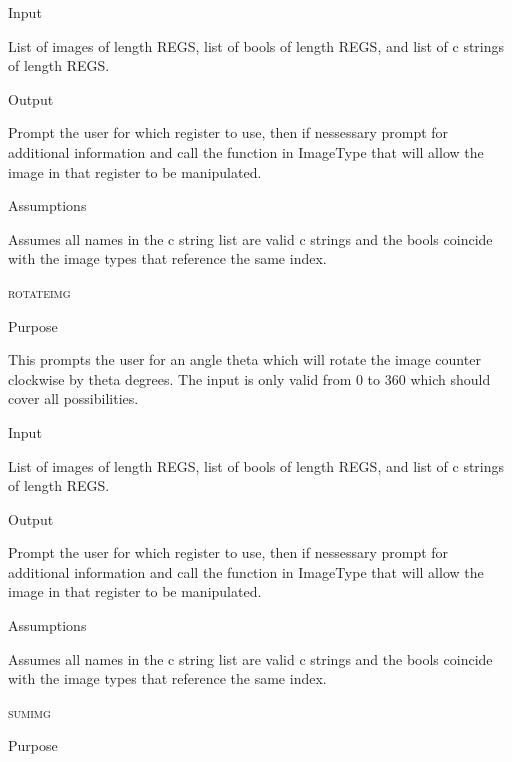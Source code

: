 \documentclass[pdftex, 11pt]{article}
\begin{document}
\begin{description}
\begin{description}
			\item{Input}

				List of images of length REGS, list of bools of length
				REGS, and list of c strings of length REGS.

			\item{Output}

				Prompt the user for which register to use, then if nessessary
				prompt for additional information and call the function
				in ImageType that will allow the image in that register to
				be manipulated.

			\item{Assumptions}

				Assumes all names in the c string list are valid c
				strings and the bools coincide with the image types that
				reference the same index.

		\end{description}



	\item{\textsc{rotateimg}}
		\begin{description}
			\item{Purpose}

				This prompts the user for an angle theta which will rotate the image counter 
				clockwise by theta degrees.  The input is only valid from 0 to 360 which
				should cover all possibilities.

			\item{Input}

				List of images of length REGS, list of bools of length
				REGS, and list of c strings of length REGS.

			\item{Output}

				Prompt the user for which register to use, then if nessessary
				prompt for additional information and call the function
				in ImageType that will allow the image in that register to
				be manipulated.

			\item{Assumptions}

				Assumes all names in the c string list are valid c
				strings and the bools coincide with the image types that
				reference the same index.

		\end{description}



	\item{\textsc{sumimg}}
		\begin{description}
			\item{Purpose}


\end{description}
\end{description}
\end{document}
